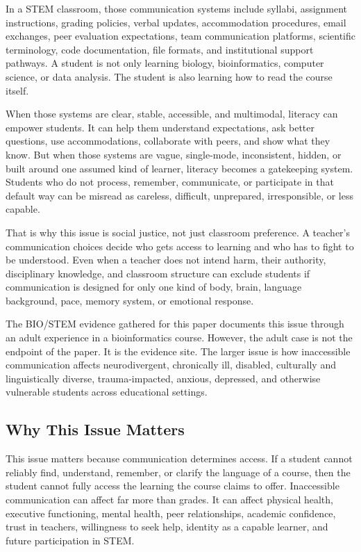 In a STEM classroom, those communication systems include syllabi, assignment instructions, grading policies, verbal updates, accommodation procedures, email exchanges, peer evaluation expectations, team communication platforms, scientific terminology, code documentation, file formats, and institutional support pathways. A student is not only learning biology, bioinformatics, computer science, or data analysis. The student is also learning how to read the course itself.

When those systems are clear, stable, accessible, and multimodal, literacy can empower students. It can help them understand expectations, ask better questions, use accommodations, collaborate with peers, and show what they know. But when those systems are vague, single-mode, inconsistent, hidden, or built around one assumed kind of learner, literacy becomes a gatekeeping system. Students who do not process, remember, communicate, or participate in that default way can be misread as careless, difficult, unprepared, irresponsible, or less capable.

That is why this issue is social justice, not just classroom preference. A teacher's communication choices decide who gets access to learning and who has to fight to be understood. Even when a teacher does not intend harm, their authority, disciplinary knowledge, and classroom structure can exclude students if communication is designed for only one kind of body, brain, language background, pace, memory system, or emotional response.

The BIO/STEM evidence gathered for this paper documents this issue through an adult experience in a bioinformatics course. However, the adult case is not the endpoint of the paper. It is the evidence site. The larger issue is how inaccessible communication affects neurodivergent, chronically ill, disabled, culturally and linguistically diverse, trauma-impacted, anxious, depressed, and otherwise vulnerable students across educational settings.

\subsection*{Why This Issue Matters}

This issue matters because communication determines access. If a student cannot reliably find, understand, remember, or clarify the language of a course, then the student cannot fully access the learning the course claims to offer. Inaccessible communication can affect far more than grades. It can affect physical health, executive functioning, mental health, peer relationships, academic confidence, trust in teachers, willingness to seek help, identity as a capable learner, and future participation in STEM.

